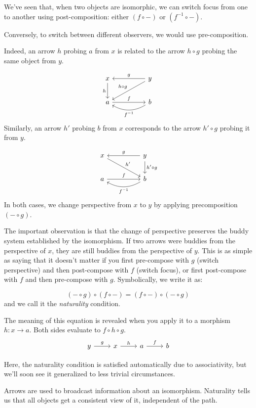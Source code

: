 \documentclass[DaoFP]{subfiles}
\begin{document}
We've seen that, when two objects are isomorphic, we can switch focus from one to another using post-composition: either $(f \circ -)$ or $(f^{-1} \circ -)$. 

Conversely, to switch between different observers, we would use pre-composition. 

Indeed, an arrow $h$ probing $a$ from $x$ is related to the arrow $h\circ g$ probing the same object from $y$.

\[
 \begin{tikzcd}
 x
 \arrow[d, "h"']
 && y
 \arrow[ll, "g"']
  \arrow[dll, "h \circ g"']
 \\
 a
 \arrow[rr, "f"]
  && b
 \arrow[ll, bend left,  "f^{-1}"]
 \end{tikzcd}
\]
Similarly, an arrow $h'$ probing $b$ from $x$ corresponds to the arrow $h' \circ g$ probing it from $y$. 

\[
 \begin{tikzcd}
 x
 \arrow[drr, "h'"]
 && y
 \arrow[ll, "g"']
  \arrow[d, "h' \circ g"]
 \\
 a
 \arrow[rr, "f"]
  && b
 \arrow[ll, bend left,  "f^{-1}"]
 \end{tikzcd}
\]
In both cases, we change perspective from $x$ to $y$ by applying precomposition $(- \circ g)$.

The important observation is that the change of perspective preserves the buddy system established by the isomorphism. If two arrows were buddies from the perspective of $x$, they are still buddies from the perspective of $y$. This is as simple as saying that it doesn't matter if you first pre-compose with $g$ (switch perspective) and then post-compose with $f$ (switch focus), or first post-compose with $f$ and then pre-compose with $g$. Symbolically, we write it as:

\[(- \circ g) \circ (f \circ -) = (f \circ -) \circ (- \circ g)\]
and we call it the \emph{naturality} condition.

The meaning of this equation is revealed when you apply it to a morphism $h \colon x \to a$. Both sides evaluate to $f \circ h \circ g$.  \[
 \begin{tikzcd}
 y \arrow[r, "g"] &x \arrow[r, "h"] & a \arrow[r, "f"] & b
\end{tikzcd}
\]

Here, the naturality condition is satisfied automatically due to associativity, but we'll soon see it generalized to less trivial circumstances.


Arrows are used to broadcast information about an isomorphism. Naturality tells us that all objects get a consistent view of it, independent of the path. 
\end{document}
